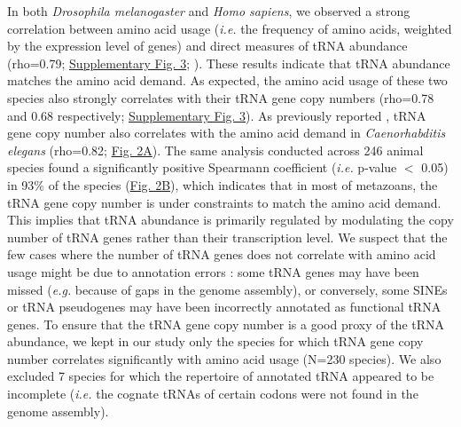 In both \textit{Drosophila melanogaster} and \textit{Homo sapiens}, we observed a strong correlation between amino acid usage (\textit{i.e.} the frequency of amino acids, weighted by the expression level of genes) and direct measures of tRNA abundance (rho=0.79; \hyperref[suppfig:CU3]{Supplementary Fig. 3}; \citet{behrens_high-resolution_2021}). These results indicate that tRNA abundance matches the amino acid demand. As expected, the amino acid usage of these two species also strongly correlates with their tRNA gene copy numbers (rho=0.78 and 0.68 respectively; \hyperref[suppfig:CU3]{Supplementary Fig. 3}). As previously reported \citep{duret_trna_2000}, tRNA gene copy number also correlates with the amino acid demand in \textit{Caenorhabditis elegans} (rho=0.82; \hyperref[fig:CU2]{Fig. 2A}). The same analysis conducted across 246 animal species found a significantly positive Spearmann coefficient (\textit{i.e.} p-value $<$ 0.05) in 93\% of the species (\hyperref[fig:CU2]{Fig. 2B}), which indicates that in most of metazoans, the tRNA gene copy number is under constraints to match the amino acid demand. This implies that tRNA abundance is primarily regulated by modulating the copy number of tRNA genes rather than their transcription level. We suspect that the few cases where the number of tRNA genes does not correlate with amino acid usage might be due to annotation errors : some tRNA genes may have been missed (\textit{e.g.} because of gaps in the genome assembly), or conversely, some SINEs or tRNA pseudogenes may have been incorrectly annotated as functional tRNA genes. To ensure that the tRNA gene copy number is a good proxy of the tRNA abundance, we kept in our study only the species for which tRNA gene copy number correlates significantly with amino acid usage (N=230 species). We also excluded 7 species for which the repertoire of annotated tRNA appeared to be incomplete (\textit{i.e.} the cognate tRNAs of certain codons were not found in the genome assembly).

